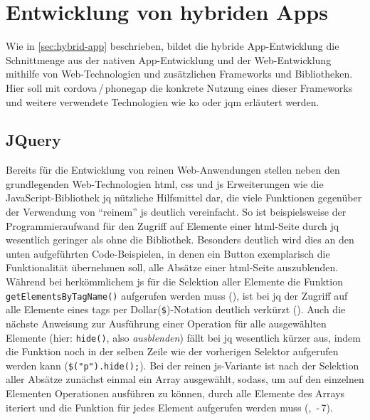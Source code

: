 \section{Entwicklung von hybriden Apps}\label{sec:hybrid-dev}

Wie in \ref{sec:hybrid-app} beschrieben, bildet die hybride App-Entwicklung die Schnittmenge aus der nativen App-Entwicklung und der Web-Entwicklung mithilfe von Web-Technologien und zusätzlichen Frameworks und Bibliotheken. 
Hier soll mit \gls{cordova}\,/\,\gls{phonegap} die konkrete Nutzung eines dieser Frameworks und weitere verwendete Technologien wie \gls{ko} oder \gls{jqm} erläutert werden.

\subsection{JQuery}

Bereits für die Entwicklung von reinen Web-Anwendungen stellen neben den grundlegenden Web-Technologien \gls{html}, \gls{css} und \gls{js} Erweiterungen wie die JavaScript-Bibliothek \gls{jq} nützliche Hilfsmittel dar, die viele Funktionen gegenüber der Verwendung von \enquote{reinem} \gls{js} deutlich vereinfacht.
So ist beispielsweise der Programmieraufwand für den Zugriff auf Elemente einer \gls{html}-Seite durch \gls{jq} wesentlich geringer als ohne die Bibliothek.
Besonders deutlich wird dies an den unten aufgeführten Code-Beispielen, in denen ein Button exemplarisch die Funktionalität übernehmen soll, alle Absätze einer \gls{html}-Seite auszublenden.
Während bei herkömmlichem \gls{js} für die Selektion aller Elemente die Funktion \lstinline|getElementsByTagName()| aufgerufen werden muss (), ist bei \gls{jq} der Zugriff auf alle Elemente eines \glspl{tag} per Dollar(\lstinline|$|)-Notation deutlich verkürzt ().
Auch die nächste Anweisung zur Ausführung einer Operation für alle ausgewählten Elemente (hier: \lstinline|hide()|, also \textit{ausblenden}) fällt bei \gls{jq} wesentlich kürzer aus, indem die Funktion noch in der selben Zeile wie der vorherigen Selektor aufgerufen werden kann (\lstinline|$("p").hide();|).
Bei der reinen \gls{js}-Variante ist nach der Selektion aller Absätze zunächst einmal ein Array ausgewählt, sodass, um auf den einzelnen Elementen Operationen ausführen zu können, durch alle Elemente des Arrays iteriert und die Funktion für jedes Element aufgerufen werden muss (, \,-\,7).

\par\noindent\begin{minipage}{\linewidth}

\end{minipage}\par\addvspace{\topskip}

